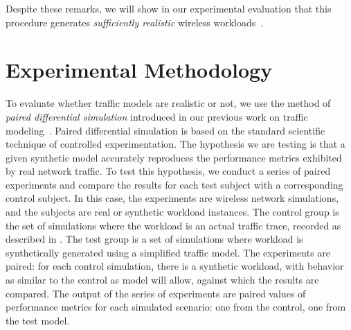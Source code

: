 \documentclass[twocolumn,final]{svjour3}
\begin{document}
Despite these remarks, we will show in our experimental evaluation that this procedure generates \emph{sufficiently realistic} wireless workloads~\cite{Karpinski07:realism,Karpinski07:cbr-failure}.



\section{Experimental Methodology}
\label{sec:methodology}

To evaluate whether traffic models are realistic or not, we use the method of \textit{paired differential simulation} introduced in our previous work on traffic modeling~\cite{Karpinski07:realism,Karpinski07:cbr-failure}. %
%
%
Paired differential simulation is based on the standard scientific technique of controlled experimentation. 
The hypothesis we are testing is that a given synthetic model accurately reproduces the performance metrics exhibited by real network traffic. To test this hypothesis, we conduct a series of paired experiments and compare the results for each test subject with a corresponding control subject. In this case, the experiments are wireless network simulations, and the subjects are real or synthetic workload instances. The control group is the set of simulations where the workload is an actual traffic trace, recorded as described in . The test group is a set of simulations where workload is synthetically generated using a simplified traffic model. The experiments are paired: for each control simulation, there is a synthetic workload, with behavior as similar to the control as model will allow, against which the results are compared. The output of the series of experiments are paired values of performance metrics for each simulated scenario: one from the control, one from the test model.

\end{document}

